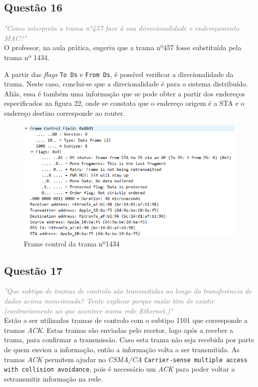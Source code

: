 \documentclass{llncs}
\newcommand{\questionE}[1]{\textcolor{gray}{\textit{"#1"}}}
\begin{document}
\subsection*{Questão 16}
\hspace{3mm} 
\questionE{Como interpreta a trama nº457 face à sua direccionalidade e endereçamento MAC?}\\ 

O professor, na aula prática, sugeriu que a trama nº457 fosse substituída pela trama nº 1434.

A partir das \textit{flags} \texttt{To Ds} e \texttt{From Ds}, é possível verificar a direcionalidade da trama. Neste caso, conclui-se que a direcionalidade é para o sistema distribuído. Aliás, essa é também uma informação que se pode obter a partir dos endereços especificados na figura 22, onde se constata que o endereço origem é a STA e o endereço destino corresponde ao router.

\begin{figure}[H]
\begin{center}
\includegraphics[width=12cm]{16.PNG}
\end{center}
\caption{Frame control da trama nº1434}
\end{figure}

\clearpage

\subsection*{Questão 17}
\hspace{3mm} 
\questionE{Que subtipo de tramas de controlo são transmitidas ao longo da transferência de dados acima mencionada? Tente explicar porque razão têm de existir (contrariamente ao que acontece numa rede Ethernet.)}\\

Estão a ser utilizadas tramas de controlo com o subtipo 1101 que corresponde a tramas \textit{ACK}. Estas tramas são enviadas pelo recetor, logo após a receber a trama, para confirmar a transmissão. Caso esta trama não seja recebida por parte de quem enviou a informação, então a informação volta a ser transmitida. As tramas \textit{ACK} permitem ajudar no \textit{CSMA/CA} \texttt{Carrier-sense multiple access with collision avoidance}, pois é necessário um \textit{ACK} para poder voltar a retransmitir informação na rede.
\end{document}
